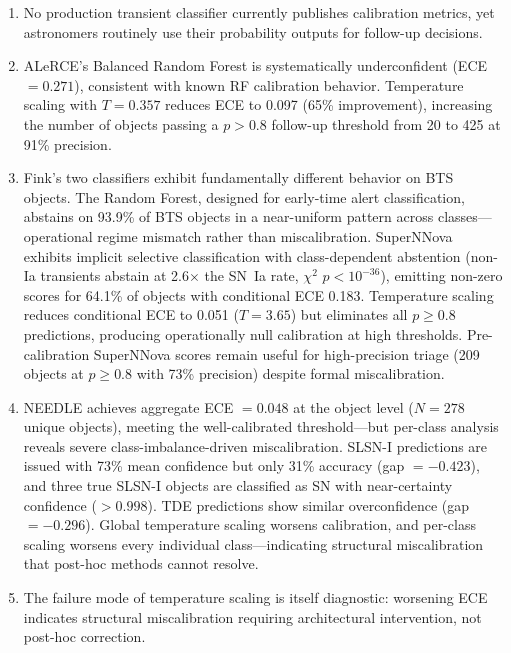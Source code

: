 \documentclass[twocolumn]{aastex631}
\begin{document}
\begin{enumerate}
    \item No production transient classifier currently publishes calibration metrics, yet astronomers routinely use their probability outputs for follow-up decisions.

    \item ALeRCE's Balanced Random Forest is systematically underconfident (ECE $= 0.271$), consistent with known RF calibration behavior. Temperature scaling with $T = 0.357$ reduces ECE to 0.097 (65\% improvement), increasing the number of objects passing a $p > 0.8$ follow-up threshold from 20 to 425 at 91\% precision.

    \item Fink's two classifiers exhibit fundamentally different behavior on BTS objects. The Random Forest, designed for early-time alert classification, abstains on 93.9\% of BTS objects in a near-uniform pattern across classes---operational regime mismatch rather than miscalibration. SuperNNova exhibits implicit selective classification with class-dependent abstention (non-Ia transients abstain at 2.6$\times$ the SN~Ia rate, $\chi^2$ $p < 10^{-36}$), emitting non-zero scores for 64.1\% of objects with conditional ECE 0.183. Temperature scaling reduces conditional ECE to 0.051 ($T = 3.65$) but eliminates all $p \ge 0.8$ predictions, producing operationally null calibration at high thresholds. Pre-calibration SuperNNova scores remain useful for high-precision triage (209 objects at $p \ge 0.8$ with 73\% precision) despite formal miscalibration.

    \item NEEDLE achieves aggregate ECE $= 0.048$ at the object level ($N = 278$ unique objects), meeting the well-calibrated threshold---but per-class analysis reveals severe class-imbalance-driven miscalibration. SLSN-I predictions are issued with 73\% mean confidence but only 31\% accuracy (gap $= -0.423$), and three true SLSN-I objects are classified as SN with near-certainty confidence ($> 0.998$). TDE predictions show similar overconfidence (gap $= -0.296$). Global temperature scaling worsens calibration, and per-class scaling worsens every individual class---indicating structural miscalibration that post-hoc methods cannot resolve.

    \item The failure mode of temperature scaling is itself diagnostic: worsening ECE indicates structural miscalibration requiring architectural intervention, not post-hoc correction.
\end{enumerate}
\end{document}

